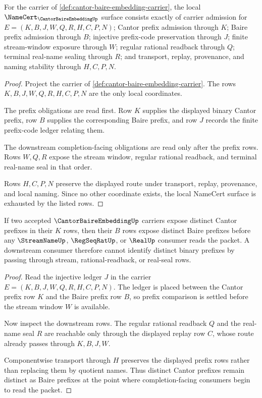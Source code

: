 \begin{theorem}
\label{thm:cantor-baire-embedding-namecert-obligations}
For the carrier of \autoref{def:cantor-baire-embedding-carrier}, the local $\NameCert_{\CantorBaireEmbeddingUp}$ surface consists exactly of carrier admission for $E=(K,B,J,W,Q,R,H,C,P,N)$; Cantor prefix admission through $K$; Baire prefix admission through $B$; injective prefix-code preservation through $J$; finite stream-window exposure through $W$; regular rational readback through $Q$; terminal real-name sealing through $R$; and transport, replay, provenance, and naming stability through $H,C,P,N$.
\end{theorem}
\begin{proof}
Project the carrier of \autoref{def:cantor-baire-embedding-carrier}. The rows $K,B,J,W,Q,R,H,C,P,N$ are the only local coordinates.

The prefix obligations are read first. Row $K$ supplies the displayed binary Cantor prefix, row $B$ supplies the corresponding Baire prefix, and row $J$ records the finite prefix-code ledger relating them.

The downstream completion-facing obligations are read only after the prefix rows. Rows $W,Q,R$ expose the stream window, regular rational readback, and terminal real-name seal in that order.

Rows $H,C,P,N$ preserve the displayed route under transport, replay, provenance, and local naming. Since no other coordinate exists, the local NameCert surface is exhausted by the listed rows.
\end{proof}

\begin{theorem}
\label{thm:cantor-baire-embedding-prefix-injection}
If two accepted $\CantorBaireEmbeddingUp$ carriers expose distinct Cantor prefixes in their $K$ rows, then their $B$ rows expose distinct Baire prefixes before any $\StreamNameUp$, $\RegSeqRatUp$, or $\RealUp$ consumer reads the packet. A downstream consumer therefore cannot identify distinct binary prefixes by passing through stream, rational-readback, or real-seal rows.
\end{theorem}
\begin{proof}
Read the injective ledger $J$ in the carrier $E=(K,B,J,W,Q,R,H,C,P,N)$. The ledger is placed between the Cantor prefix row $K$ and the Baire prefix row $B$, so prefix comparison is settled before the stream window $W$ is available.

Now inspect the downstream rows. The regular rational readback $Q$ and the real-name seal $R$ are reachable only through the displayed replay row $C$, whose route already passes through $K,B,J,W$.

Componentwise transport through $H$ preserves the displayed prefix rows rather than replacing them by quotient names. Thus distinct Cantor prefixes remain distinct as Baire prefixes at the point where completion-facing consumers begin to read the packet.
\end{proof}


